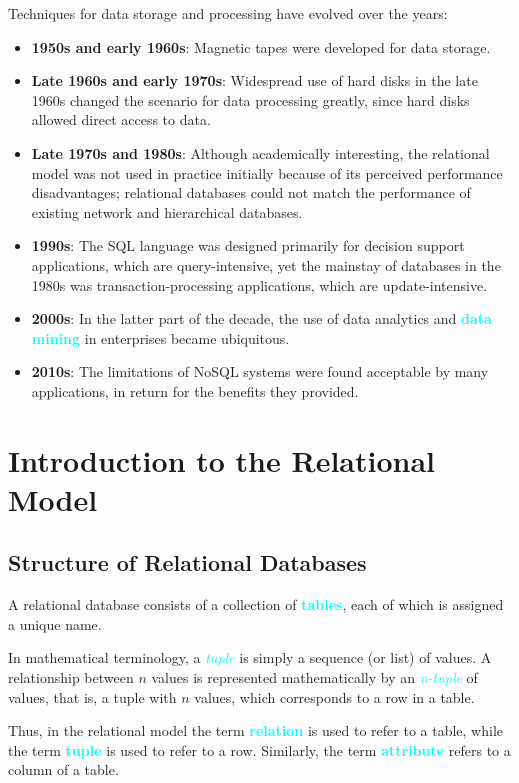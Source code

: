 \documentclass{Beautybook-EN}
\newcommand{\textcy}[1]{\textbf{\textcolor{cyan}{#1}}}
\newcommand{\textcyi}[1]{\textit{\textcolor{cyan}{#1}}}
\begin{document}
Techniques for data storage and processing have evolved over the years:
\begin{itemize}
    \item\textbf{1950s and early 1960s}: Magnetic tapes were developed for data storage.
    \item\textbf{Late 1960s and early 1970s}: Widespread use of hard disks in the late 1960s changed the scenario for data processing greatly, since hard disks allowed direct access to data.
    \item\textbf{Late 1970s and 1980s}: Although academically interesting, the relational model was not used in practice initially because of its perceived performance disadvantages; relational databases could not match the performance of existing network and hierarchical databases.
    \item\textbf{1990s}: The SQL language was designed primarily for decision support applications, which are query-intensive, yet the mainstay of databases in the 1980s was transaction-processing applications, which are update-intensive.
    \item\textbf{2000s}: In the latter part of the decade, the use of data analytics and \textcy{data mining} in enterprises became ubiquitous.
    \item\textbf{2010s}: The limitations of NoSQL systems were found acceptable by many applications, in return for the benefits they provided.
\end{itemize}

\chapter{Introduction to the Relational Model}
\section{Structure of Relational Databases}

A relational database consists of a collection of \textcy{tables}, each of which is assigned a unique name.

In mathematical terminology, a \textcyi{tuple} is simply a sequence (or list) of values. A relationship between $n$ values is represented mathematically by an \textcyi{n-tuple} of values, that is, a tuple with $n$ values, which corresponds to a row in a table.

Thus, in the relational model the term \textcy{relation} is used to refer to a table, while the term \textcy{tuple} is used to refer to a row. Similarly, the term \textcy{attribute} refers to a column of a table.
\end{document}
